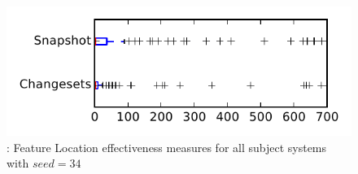 
\begin{figure}
\centering
\includegraphics[height=0.4\textheight]{figures/flt_seed/rq1_tiny_34}
\caption{\rone: Feature Location effectiveness measures for all subject systems with $seed=34$}
\label{fig:flt_seed:rq1:tiny}
\end{figure}
